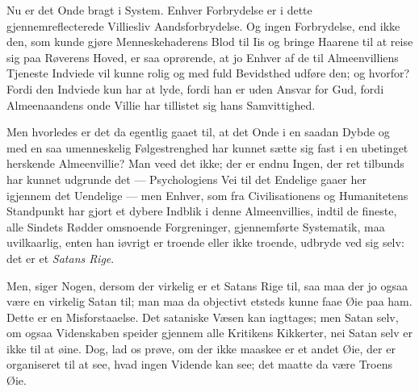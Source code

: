 \documentclass[12pt]{book}
\begin{document}
Nu er det Onde bragt i System. Enhver Forbrydelse er i dette
gjennemreflecterede Villiesliv Aandsforbrydelse. Og ingen
Forbrydelse, end ikke den, som kunde gjøre Menneskehaderens Blod til
Iis og bringe Haarene til at reise sig paa Røverens Hoved, er saa
oprørende, at jo Enhver af de til Almeenvilliens Tjeneste Indviede
vil kunne rolig og med fuld Bevidsthed udføre den; og hvorfor? Fordi
den Indviede kun har at lyde, fordi han er uden Ansvar for Gud,
fordi Almeenaandens onde Villie har tillistet sig hans Samvittighed.

Men hvorledes er det da egentlig gaaet til, at det Onde i en saadan
Dybde og med en saa umenneskelig Følgestrenghed har kunnet sætte sig
fast i en ubetinget herskende Almeenvillie? Man veed det ikke; der
er endnu Ingen, der ret tilbunds har kunnet udgrunde det ---
Psychologiens Vei til det Endelige gaaer her igjennem det Uendelige
--- men Enhver, som fra Civilisationens og Humanitetens Standpunkt
har gjort et dybere Indblik i denne Almeenvillies, indtil de fineste,
alle Sindets Rødder omsnoende Forgreninger, gjennemførte
Systematik, maa uvilkaarlig, enten han iøvrigt er troende eller ikke
troende, udbryde ved sig selv: det er et \emph{Satans Rige}.

Men, siger Nogen, dersom der virkelig er et Satans Rige til, saa maa
der jo ogsaa være en virkelig Satan til;
man maa da objectivt etsteds kunne faae Øie paa ham. Dette er en
Misforstaaelse. Det sataniske Væsen kan iagttages; men Satan selv,
om ogsaa Videnskaben speider gjennem alle Kritikens Kikkerter, nei
Satan selv er ikke til at øine. Dog, lad os prøve, om der ikke
maaskee er et andet Øie, der er organiseret til at see, hvad ingen
Vidende kan see; det maatte da være Troens Øie.
\end{document}

